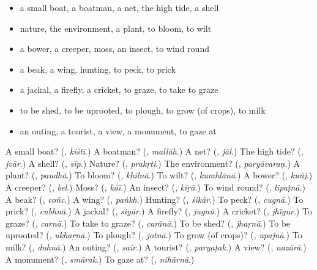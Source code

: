 \begin{itemize}
\raggedright
  \item a small boat, a boatman, a net, the high tide, a shell
  \item nature, the environment, a plant, to bloom, to wilt
  \item a bower, a creeper, moss, an insect, to wind round
  \item a beak, a wing, hunting, to peck, to prick
  \item a jackal, a firefly, a cricket, to graze, to take to graze
  \item to be shed, to be uprooted, to plough, to grow (of crops), to milk
  \item an outing, a tourist, a view, a monument, to gaze at
\end{itemize}

\begin{tcolorbox}[breakable,colback=teal!4,colframe=teal!35!black,title={Before you move on}]
A small boat? (\textbf{}, \emph{kiśtī}.) A boatman? (\textbf{}, \emph{mallāh}.) A net? (\textbf{}, \emph{jāl}.) The high tide? (\textbf{}, \emph{jvār}.) A shell? (\textbf{}, \emph{sīp}.) Nature? (\textbf{}, \emph{prakṛti}.) The environment? (\textbf{}, \emph{paryāvaraṇ}.) A plant? (\textbf{}, \emph{paudhā}.) To bloom? (\textbf{}, \emph{khilnā}.) To wilt? (\textbf{}, \emph{kumhlānā}.) A bower? (\textbf{}, \emph{kuñj}.) A creeper? (\textbf{}, \emph{bel}.) Moss? (\textbf{}, \emph{kāī}.) An insect? (\textbf{}, \emph{kīṛā}.) To wind round? (\textbf{}, \emph{lipaṭnā}.) A beak? (\textbf{}, \emph{coñc}.) A wing? (\textbf{}, \emph{paṅkh}.) Hunting? (\textbf{}, \emph{śikār}.) To peck? (\textbf{}, \emph{cugnā}.) To prick? (\textbf{}, \emph{cubhnā}.) A jackal? (\textbf{}, \emph{siyār}.) A firefly? (\textbf{}, \emph{jugnū}.) A cricket? (\textbf{}, \emph{jhī̃gur}.) To graze? (\textbf{}, \emph{carnā}.) To take to graze? (\textbf{}, \emph{carānā}.) To be shed? (\textbf{}, \emph{jhaṛnā}.) To be uprooted? (\textbf{}, \emph{ukhaṛnā}.) To plough? (\textbf{}, \emph{jotnā}.) To grow (of crops)? (\textbf{}, \emph{upajnā}.) To milk? (\textbf{}, \emph{duhnā}.) An outing? (\textbf{}, \emph{sair}.) A tourist? (\textbf{}, \emph{paryaṭak}.) A view? (\textbf{}, \emph{nazārā}.) A monument? (\textbf{}, \emph{smārak}.) To gaze at? (\textbf{}, \emph{nihārnā}.)
\end{tcolorbox}

